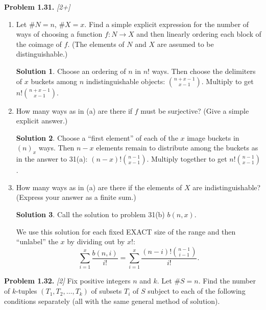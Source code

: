 \documentclass[11pt]{article}
\theoremstyle{definition}
\newtheorem*{solution}{Solution}
\newcounter{probnum}
\newcommand{\problem}[1]{%
  \setcounter{probnum}{#1}%
  \medskip
  \noindent\textbf{Problem 1.#1.}\quad
}
\begin{document}
\problem{31} \textit{[2+]}
\begin{enumerate}[label=(\alph*)]
  \item Let $\#N = n$, $\#X = x$. Find a simple explicit expression for the number of
    ways of choosing a function $f : N \to X$ and then linearly ordering each block of
    the coimage of $f$. (The elements of $N$ and $X$ are assumed to be
    distinguishable.)
    \begin{solution}
    Choose an ordering of $n$ in $n!$ ways. Then choose the delimiters of $x$ buckets
    among $n$ indistinguishable objects: $\binom{n+x-1}{x-1}$. Multiply to get
    $n!\binom{n+x-1}{x-1}$.
    \end{solution}

  \item How many ways as in (a) are there if $f$ must be surjective? (Give a simple
    explicit answer.)
    \begin{solution}
    Choose a ``first element'' of each of the $x$ image buckets in $(n)_x$ ways. Then
    $n-x$ elements remain to distribute among the buckets as in the answer to 31(a):
    $(n-x)!\binom{n-1}{x-1}$. Multiply together to get $n!\binom{n-1}{x-1}$.
    \end{solution}

  \item How many ways as in (a) are there if the elements of $X$ are
    indistinguishable? (Express your answer as a finite sum.)
    \begin{solution}
    Call the solution to problem 31(b) $b(n,x)$.

    We use this solution for each fixed EXACT size of the range and then ``unlabel''
    the $x$ by dividing out by $x!$:
    \[
      \sum_{i=1}^{x} \frac{b(n,i)}{i!}
      = \sum_{i=1}^{x} \frac{(n-i)!\binom{n-1}{i-1}}{i!}.
    \]
    \end{solution}
\end{enumerate}

\problem{32} \textit{[2]}
Fix positive integers $n$ and $k$. Let $\#S = n$. Find the number of $k$-tuples
$(T_1, T_2, \ldots, T_k)$ of subsets $T_i$ of $S$ subject to each of the following
conditions separately (all with the same general method of solution).
\end{document}
